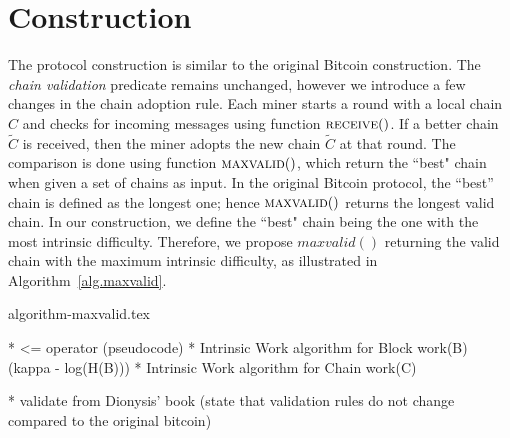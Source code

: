 \section{Construction}
The protocol construction is similar to the original Bitcoin construction.
The \emph{chain validation} predicate remains unchanged, however we introduce
a few changes in the chain adoption rule.
Each miner starts a round with a local chain $C$ and checks for incoming messages
using function $\textsc{receive}()$. If a better chain $\widetilde{C}$ is received, then the
miner adopts the new chain $\widetilde{C}$ at that round. The comparison is done using
function $\textsc{maxvalid}()$, which return the ``best" chain
when given a set of chains as input. In the original Bitcoin protocol, the
``best'' chain is defined as the longest one; hence $\textsc{maxvalid}()$ returns
the longest valid chain. In our construction, we define the ``best" chain being
the one with the most intrinsic difficulty.
Therefore, we propose $maxvalid()$ returning the valid chain
with the maximum intrinsic difficulty, as illustrated in Algorithm~\ref{alg.maxvalid}.

{algorithm-maxvalid.tex}

* <= operator (pseudocode)
* Intrinsic Work algorithm for Block work(B) (kappa - log(H(B)))
* Intrinsic Work algorithm for Chain work(C)

* validate from Dionysis' book (state that validation rules do not change compared to the original bitcoin)
